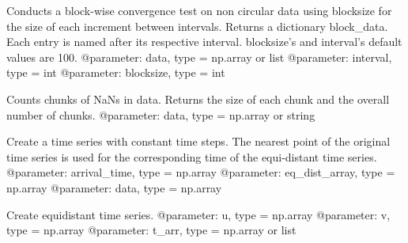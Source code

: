 \documentclass[letterpaper,10pt,english]{sphinxmanual}
\begin{document}

\begin{fulllineitems}
\label{\detokenize{index:windtunnel.convergence_test_2}}
Conducts a block-wise convergence test on non circular data using 
blocksize for the size of each increment between intervals. Returns a 
dictionary block\_data. Each entry is named after its respective interval.
blocksize’s and interval’s default values are 100.
@parameter: data, type = np.array or list
@parameter: interval, type = int
@parameter: blocksize, type = int

\end{fulllineitems}


\begin{fulllineitems}
\label{\detokenize{index:windtunnel.count_nan_chunks}}
Counts chunks of NaNs in data. Returns the size of each chunk and
the overall number of chunks.
@parameter: data, type = np.array or string

\end{fulllineitems}


\begin{fulllineitems}
\label{\detokenize{index:windtunnel.equ_dist_ts}}
Create a time series with constant time steps. The nearest point of the 
original time series is used for the corresponding time of the equi-distant
time series.
@parameter: arrival\_time, type = np.array
@parameter: eq\_dist\_array, type = np.array
@parameter: data, type = np.array

\end{fulllineitems}


\begin{fulllineitems}
\label{\detokenize{index:windtunnel.equidistant}}
Create equidistant time series.
@parameter: u, type = np.array
@parameter: v, type = np.array
@parameter: t\_arr, type = np.array or list

\end{fulllineitems}
\end{document}

